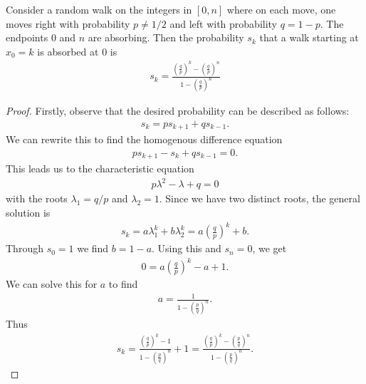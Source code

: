 \documentclass{article}
\begin{document}
\begin{claim*}
  Consider a random walk on the integers in $[0,n]$ where on each move, one moves right with
  probability $p\not=1/2$ and left with probability $q=1-p$. The endpoints $0$ and $n$ are absorbing.
  Then the probability $s_k$ that a walk starting at $x_0=k$ is absorbed at $0$ is
  \begin{align*}
    s_k = \frac{\left(\frac{q}{p}\right)^k-\left(\frac{q}{p}\right)^n}{1-\left(\frac{q}{p}\right)^n}
  \end{align*}
\end{claim*}
\begin{proof}
  Firstly, observe that the desired probability can be described as follows:
  \begin{align*}
    s_{k} = ps_{k+1} + qs_{k-1}.
  \end{align*}
  We can rewrite this to find the homogenous difference equation
  \begin{align*}
    ps_{k+1} - s_k + qs_{k-1} = 0.
  \end{align*}
  This leads us to the characteristic equation
  \begin{align*}
    p\lambda^2 - \lambda + q = 0
  \end{align*}
  with the roots $\lambda_1 = q/p$ and $\lambda_2 = 1$.
  Since we have two distinct roots, the general solution is
  \begin{align*}
    s_k = a\lambda_1^k + b\lambda_2^k = a\left(\frac{q}{p}\right)^k + b.
  \end{align*}
  Through $s_0=1$ we find $b=1-a$. Using this and $s_n=0$, we get
  \begin{align*}
    0 = a\left(\frac{q}{p}\right)^k - a + 1.
  \end{align*}
  We can solve this for $a$ to find
  \begin{align*}
    a = \frac{1}{1-\left(\frac{p}{q}\right)^n}.
  \end{align*}
  Thus
  \begin{align*}
    s_k =\frac{\left(\frac{q}{p}\right)^k-1}{1-\left(\frac{p}{q}\right)^n}+1
    =\frac{\left(\frac{q}{p}\right)^k-\left(\frac{p}{q}\right)^n}{1-\left(\frac{p}{q}\right)^n}.
  \end{align*}
\end{proof}
\end{document}
